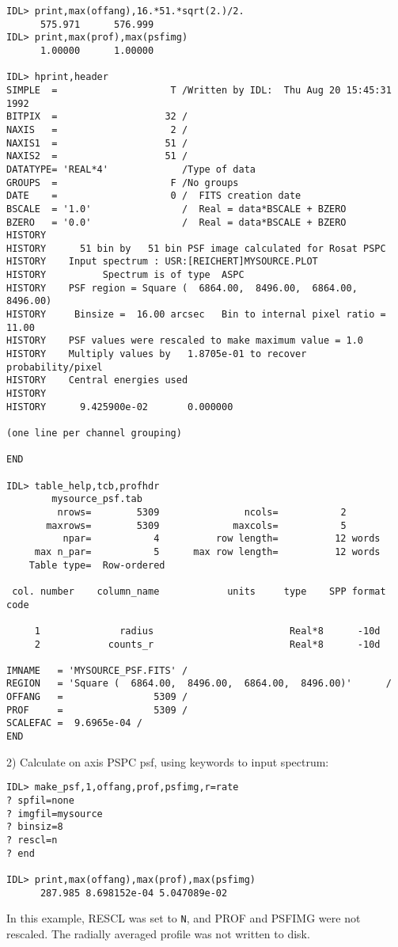 \medskip\noindent
\begin{verbatim}
IDL> print,max(offang),16.*51.*sqrt(2.)/2.
      575.971      576.999
IDL> print,max(prof),max(psfimg)
      1.00000      1.00000
 
IDL> hprint,header
SIMPLE  =                    T /Written by IDL:  Thu Aug 20 15:45:31 1992
BITPIX  =                   32 /
NAXIS   =                    2 /
NAXIS1  =                   51 /
NAXIS2  =                   51 /
DATATYPE= 'REAL*4'             /Type of data
GROUPS  =                    F /No groups
DATE    =                    0 /  FITS creation date
BSCALE  = '1.0'                /  Real = data*BSCALE + BZERO
BZERO   = '0.0'                /  Real = data*BSCALE + BZERO
HISTORY
HISTORY      51 bin by   51 bin PSF image calculated for Rosat PSPC
HISTORY    Input spectrum : USR:[REICHERT]MYSOURCE.PLOT
HISTORY          Spectrum is of type  ASPC
HISTORY    PSF region = Square (  6864.00,  8496.00,  6864.00,  8496.00)
HISTORY     Binsize =  16.00 arcsec   Bin to internal pixel ratio =   11.00
HISTORY    PSF values were rescaled to make maximum value = 1.0
HISTORY    Multiply values by   1.8705e-01 to recover probability/pixel
HISTORY    Central energies used
HISTORY
HISTORY      9.425900e-02       0.000000
 
(one line per channel grouping)
 
END
 
IDL> table_help,tcb,profhdr
        mysource_psf.tab
         nrows=        5309               ncols=           2
       maxrows=        5309             maxcols=           5
          npar=           4          row length=          12 words
     max n_par=           5      max row length=          12 words
    Table type=  Row-ordered
 
 col. number    column_name            units     type    SPP format code
 
     1              radius                        Real*8      -10d
     2            counts_r                        Real*8      -10d
 
IMNAME   = 'MYSOURCE_PSF.FITS' /
REGION   = 'Square (  6864.00,  8496.00,  6864.00,  8496.00)'      /
OFFANG   =                5309 /
PROF     =                5309 /
SCALEFAC =  9.6965e-04 /
END
\end{verbatim}
 
2) Calculate on axis PSPC psf, using keywords to input spectrum:

\medskip\noindent
\begin{verbatim}
IDL> make_psf,1,offang,prof,psfimg,r=rate
? spfil=none
? imgfil=mysource
? binsiz=8
? rescl=n
? end
 
IDL> print,max(offang),max(prof),max(psfimg)
      287.985 8.698152e-04 5.047089e-02
\end{verbatim}
In this example, RESCL was set to {\tt N}, and PROF and PSFIMG were not rescaled.
The radially averaged profile was not written to disk.
 
